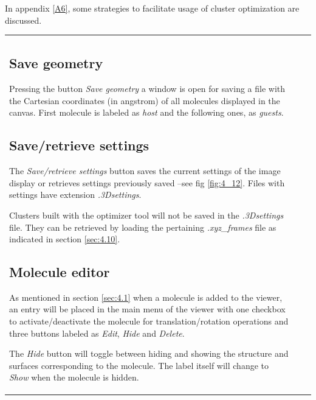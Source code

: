 \documentclass[10pt]{article}
\begin{document}
In appendix \ref{A6}, some strategies to facilitate usage of cluster optimization
are discussed.

\vspace*{5mm}

\begin{tabular}{lcr}
\hspace*{-3mm}
\begin{minipage}{.5\linewidth}
\subsection{Save geometry \label{sec:4.11}\index{3D graphics!geometry saving}}

Pressing the button {\it Save geometry}\index{save geometry}
a window is open for saving a file with the Cartesian
coordinates (in angstrom) of all molecules displayed in the canvas.
First molecule is labeled as {\it host} and the following ones,
as {\it guests}.

\subsection{Save/retrieve settings \label{sec:4.12}\index{3D graphics!save/retrieve settings}}

The {\it Save/retrieve settings}\index{save settings}\index{retrieve settings} button saves the current settings of the image display 
or retrieves settings previously saved --see fig \ref{fig:4_12}. Files with settings have extension {\it .3Dsettings}.

Clusters built with the optimizer tool will not be saved in the  
{\it *.3Dsettings} file. 
They can be retrieved\index{3D graphics!clusters retrieve}
by loading the pertaining {\it *.xyz\_frames} file as indicated in section
\ref{sec:4.10}.

\subsection{Molecule editor \label{sec:4.13}\index{3D graphics!molecule editor}}

As mentioned in section \ref{sec:4.1} when a molecule is added to the viewer,
an entry will be placed in the main menu of the viewer with one checkbox to
activate/deactivate the molecule for translation/rotation operations and three buttons
labeled as {\it Edit}, {\it Hide} and {\it Delete}.

The {\it Hide} button will toggle between hiding and showing the structure and 
surfaces corresponding to the molecule. The label itself will change to {\it Show} when the 
molecule is hidden. 


\end{minipage}
\end{tabular}
\end{document}
